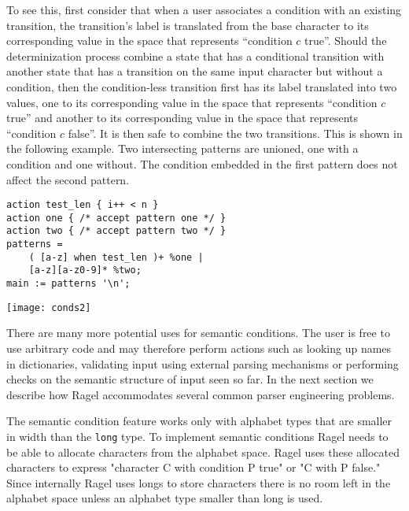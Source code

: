 \documentclass[letterpaper,11pt,oneside]{book}
\newcommand{\verbspace}{\vspace{10pt}}
\newcommand{\graphspace}{\vspace{10pt}}
\newenvironment{inline_code}{\def\baselinestretch{1}\vspace{12pt}\small}{}
\begin{document}
To see this, first consider that when a user associates a condition with an
existing transition, the transition's label is translated from the base character
to its corresponding value in the space that represents ``condition $c$ true''. Should
the determinization process combine a state that has a conditional transition
with another state that has a transition on the same input character but
without a condition, then the condition-less transition first has its label
translated into two values, one to its corresponding value in the space that
represents ``condition $c$ true'' and another to its corresponding value in the
space that represents ``condition $c$ false''. It
is then safe to combine the two transitions. This is shown in the following
example.  Two intersecting patterns are unioned, one with a condition and one
without. The condition embedded in the first pattern does not affect the second
pattern.

\begin{inline_code}
\begin{verbatim}
action test_len { i++ < n }
action one { /* accept pattern one */ }
action two { /* accept pattern two */ }
patterns = 
    ( [a-z] when test_len )+ %one |
    [a-z][a-z0-9]* %two;
main := patterns '\n';
\end{verbatim}
\end{inline_code}
\verbspace
% }%%
% END GENERATE

\graphspace
\begin{center}
\texttt{[image: conds2]}
\end{center}
\graphspace

There are many more potential uses for semantic conditions. The user is free to
use arbitrary code and may therefore perform actions such as looking up names
in dictionaries, validating input using external parsing mechanisms or
performing checks on the semantic structure of input seen so far. In the next
section we describe how Ragel accommodates several common parser engineering
problems.

The semantic condition feature works only with alphabet types that are smaller
in width than the \verb|long| type. To implement semantic conditions Ragel
needs to be able to allocate characters from the alphabet space. Ragel uses
these allocated characters to express "character C with condition P true" or "C
with P false." Since internally Ragel uses longs to store characters there is
no room left in the alphabet space unless an alphabet type smaller than long is
used.
\end{document}
